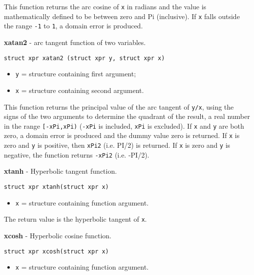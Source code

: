 \documentclass{article}
\begin{document}
This function  returns the arc cosine of \texttt{x} in radians and
the value is mathematically defined to  be  between zero
and Pi (inclusive). If \texttt{x} falls outside  the  range
\texttt{-1} to \texttt{1}, a domain error is produced.


\hrulefill{}

\textbf{xatan2} - arc tangent function of two variables.

\begin{verbatim}
struct xpr xatan2 (struct xpr y, struct xpr x)
\end{verbatim}

\begin{itemize}
\item \texttt{y} = structure containing first argument;
\item \texttt{x} = structure containing second argument.
\end{itemize}

This function returns the principal value of the arc tangent of \texttt{y/x}, 
using the signs of the two arguments to determine the 
quadrant of the result, a real number in the range \texttt{[-xPi,xPi)}
(\texttt{-xPi} is included, \texttt{xPi} is excluded). If \texttt{x} and \texttt{y}
are both zero, a domain error is produced and the dummy value
zero is returned. If \texttt{x} is zero and \texttt{y} is positive, then
\texttt{xPi2} (i.e. PI/2) is returned. 
If \texttt{x} is zero and \texttt{y} is negative, the function
returns \texttt{-xPi2} (i.e. -PI/2). 


\hrulefill{}

\textbf{xtanh} - Hyperbolic tangent function.

\begin{verbatim}
struct xpr xtanh(struct xpr x)
\end{verbatim}

\begin{itemize}
\item \texttt{x} = structure containing function argument.
\end{itemize}

The return value is the hyperbolic tangent of \texttt{x}.


\hrulefill{}

\textbf{xcosh} - Hyperbolic cosine function.

\begin{verbatim}
struct xpr xcosh(struct xpr x)
\end{verbatim}

\begin{itemize}
\item \texttt{x} = structure containing function argument.
\end{itemize}
\end{document}
